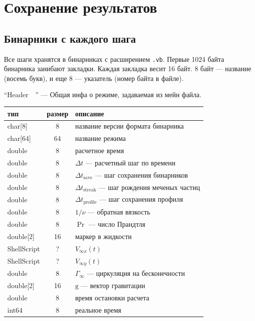\documentclass[14pt]{extreport}
\newcommand{\br}[1]{\boldsymbol{\mathrm{#1}}}
\renewcommand{\vec}[1]{\br{#1}}
\begin{document}
\newpage
\section{Сохранение результатов}

\subsection{Бинарники с каждого шага}
Все шаги хранятся в бинарниках с расширением \texttt{.vb}.
Первые 1024 байта бинарника занибают закладки.
Каждая закладка весит 16 байт.
8 байт --- название (восемь букв), и еще 8 --- указатель (номер байта в файле).

``Header~~'' --- Общая инфа о режиме, задаваемая из мейн файла.\\
\begin{tabular}{lcl}
тип & размер & описание\\\hline
char[8]      & 8  & название версии формата бинарника\\
char[64]     & 64 & название режима\\
double       & 8  & расчетное время\\
double       & 8  & $\Delta t$ --- расчетный шаг по времени\\
double       & 8  & $\Delta t_\text{save}$ --- шаг сохранения бинарников\\
double       & 8  & $\Delta t_\text{streak}$ --- шаг рождения меченых частиц\\
double       & 8  & $\Delta t_\text{profile}$ --- шаг сохранения профиля\\
double       & 8  & $1/\nu$ --- обратная вязкость\\
double       & 8  & $\Pr$ --- число Прандтля\\
double[2]    & 16 & маркер в жидкости\\
ShellScript  & ?  & $V_{\infty x} (t)$\\
ShellScript  & ?  & $V_{\infty y} (t)$\\
double       & 8  & $\Gamma_\infty$ --- циркуляция на бесконечности\\
double[2]    & 16 & $\vec g$ --- вектор гравитации\\
double       & 8  & время остановки расчета\\
int64        & 8  & реальное время\\
\hline
\end{tabular}
\end{document}
